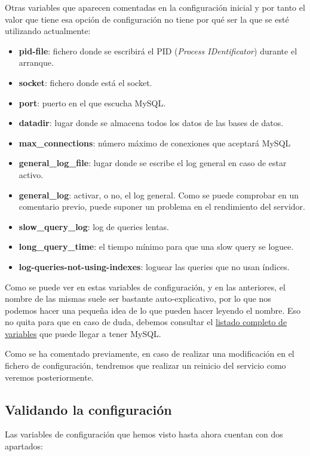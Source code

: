 Otras variables que aparecen comentadas en la configuración inicial y por tanto el valor que tiene esa opción de configuración no tiene por qué ser la que se esté utilizando actualmente:

\begin{itemize}
    \item \textbf{pid-file}: fichero donde se escribirá el PID (\textit{Process IDentificator}) durante el arranque.
    \item \textbf{socket}: fichero donde está el socket.
    \item \textbf{port}: puerto en el que escucha MySQL.
    \item \textbf{datadir}: lugar donde se almacena todos los datos de las bases de datos.
    \item \textbf{max\_connections}: número máximo de conexiones que aceptará MySQL
    \item \textbf{general\_log\_file}: lugar donde se escribe el log general en caso de estar activo.
    \item \textbf{general\_log}: activar, o no, el log general. Como se puede comprobar en un comentario previo, puede suponer un problema en el rendimiento del servidor.
    \item \textbf{slow\_query\_log}: log de queries lentas.
    \item \textbf{long\_query\_time}: el tiempo mínimo para que una slow query se loguee.
    \item \textbf{log-queries-not-using-indexes}: loguear las queries que no usan índices.
\end{itemize}

Como se puede ver en estas variables de configuración, y en las anteriores, el nombre de las mismas suele ser bastante auto-explicativo, por lo que nos podemos hacer una pequeña idea de lo que pueden hacer leyendo el nombre. Eso no quita para que en caso de duda, debemos consultar el \href{https://dev.mysql.com/doc/refman/8.0/en/server-option-variable-reference.html}{listado completo de variables} que puede llegar a tener MySQL.

Como se ha comentado previamente, en caso de realizar una modificación en el fichero de configuración, tendremos que realizar un reinicio del servicio como veremos posteriormente.

\subsection{Validando la configuración}
Las variables de configuración que hemos visto hasta ahora cuentan con dos apartados:

